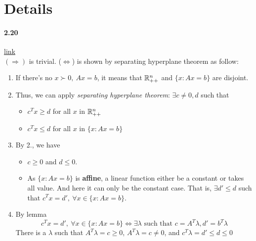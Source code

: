 \documentclass[11pt]{article}
\begin{document}
\appendix
\section{Details}

\paragraph{2.20}\label{2.20details}\hyperref[2.20]{link}\\
$(\Rightarrow)$ is trivial. ($\Leftrightarrow$) is shown by separating hyperplane theorem as follow:
\begin{enumerate}
	\item If there's no $x\succ0,\ Ax=b$, it means that ${\mathbb R}_{++}^{n}$ and $\{x: Ax=b\}$ are disjoint.
	\item Thus, we can apply {\it separating hyperplane theorem}: $\exists c\neq0,d$ such that 
	\begin{itemize}
		\item $c^Tx\geq d$ for all $x$ in ${\mathbb R}_{++}^n$
		\item $c^Tx\leq d$ for all $x$ in $\{x:Ax=b\}$
	\end{itemize}
	\item By 2., we have
	\begin{itemize}
		\item $c\geq0$ and $d\leq0$.
		\item As $\{x: Ax=b\}$ is {\bf affine}, a linear function either be a constant or takes all value. And here it can only be the constant case. That is, $\exists d'\leq d$ such that $c^Tx=d',\ \forall x\in\{x:Ax=b\}$.
	\end{itemize}
	\item By lemma
	$$c^Tx=d',\ \forall x\in\{x:Ax=b\}\Leftrightarrow\exists\lambda\mbox{ such that }c=A^T\lambda,d'=b^T\lambda$$
	There is a $\lambda$ such that $A^T\lambda=c\geq0$, $A^T\lambda=c\neq0$, and $c^T\lambda=d'\leq d\leq0$
\end{enumerate}


\newpage


\end{document}
